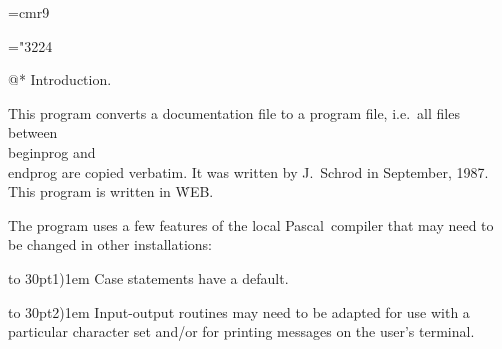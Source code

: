 
%
%


\def\title{MAKEPROG (V\version)}
\def\version{1.0}
\def\years{1988}

\font\ninerm=cmr9
\let\mc=\ninerm %

\def\hang{\hangindent 3em\indent\ignorespaces}
\def\item#1{                             %
   {\parskip=0pt\endgraf\noindent}%
   \hangindent 30pt %
   \hbox to 30pt{\hfil#1\kern 1em}%
   \ignorespaces                         %
   }

\def\PASCAL{Pascal}
\def\MAKEPROG{\leavevmode\hbox{\mc MAKEPROG\/}}
\def\ASCII{\leavevmode\hbox{\mc ASCII\/}}
\mathchardef\BA="3224      %

\def\topofcontents{\null\vfill
   \centerline{\titlefont The MAKEPROG processor}
   \vskip 15pt
   \centerline{(Version \version)}
   \vskip 2cm}
\def\botofcontents{\vfill
   \hangindent 3em
   \noindent $\copyright$ \years{} by J.~Schrod.\hfil\break
   All rights reserved.
   \par \vskip 1ex
   \noindent The source of this program may be used for
   noncommercial purposes, but credits must be given to the origin.
   \par}





@* Introduction.                                            %

\noindent This program converts a documentation file to a
program file, i.e.\ all files between \.{\\beginprog} and
\.{\\endprog} are copied verbatim.  It was written by
J.~Schrod in September, 1987.  This program is written in
\.{WEB}.

The program uses a few features of the local \PASCAL\
compiler that may need to be changed in other installations:

\item{1)} Case statements have a default.

\item{2)} Input-output routines may need to be adapted for
use with a particular character set and/or for printing
messages on the user's terminal.

